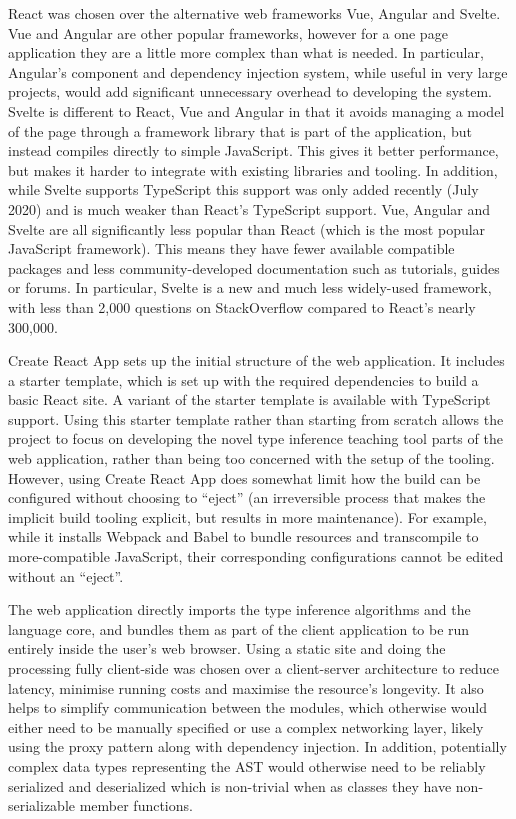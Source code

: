 \documentclass[a4paper,fleqn,12pt]{article}
\begin{document}
React was chosen over the alternative web frameworks Vue, Angular and Svelte. Vue and Angular are other popular frameworks, however for a one page application they are a little more complex than what is needed. In particular, Angular’s component and dependency injection system, while useful in very large projects, would add significant unnecessary overhead to developing the system. Svelte is different to React, Vue and Angular in that it avoids managing a model of the page through a framework library that is part of the application, but instead compiles directly to simple JavaScript. This gives it better performance, but makes it harder to integrate with existing libraries and tooling. In addition, while Svelte supports TypeScript this support was only added recently (July 2020) and is much weaker than React’s TypeScript support. Vue, Angular and Svelte are all significantly less popular than React (which is the most popular JavaScript framework). This means they have fewer available compatible packages and less community-developed documentation such as tutorials, guides or forums. In particular, Svelte is a new and much less widely-used framework, with less than 2,000 questions on StackOverflow compared to React’s nearly 300,000.

Create React App sets up the initial structure of the web application. It includes a starter template, which is set up with the required dependencies to build a basic React site. A variant of the starter template is available with TypeScript support. Using this starter template rather than starting from scratch allows the project to focus on developing the novel type inference teaching tool parts of the web application, rather than being too concerned with the setup of the tooling. However, using Create React App does somewhat limit how the build can be configured without choosing to “eject” (an irreversible process that makes the implicit build tooling explicit, but results in more maintenance). For example, while it installs Webpack and Babel to bundle resources and transcompile to more-compatible JavaScript, their corresponding configurations cannot be edited without an “eject”.

The web application directly imports the type inference algorithms and the language core, and bundles them as part of the client application to be run entirely inside the user’s web browser. Using a static site and doing the processing fully client-side was chosen over a client-server architecture to reduce latency, minimise running costs and maximise the resource’s longevity. It also helps to simplify communication between the modules, which otherwise would either need to be manually specified or use a complex networking layer, likely using the proxy pattern along with dependency injection. In addition, potentially complex data types representing the AST would otherwise need to be reliably serialized and deserialized which is non-trivial when as classes they have non-serializable member functions.
\end{document}
